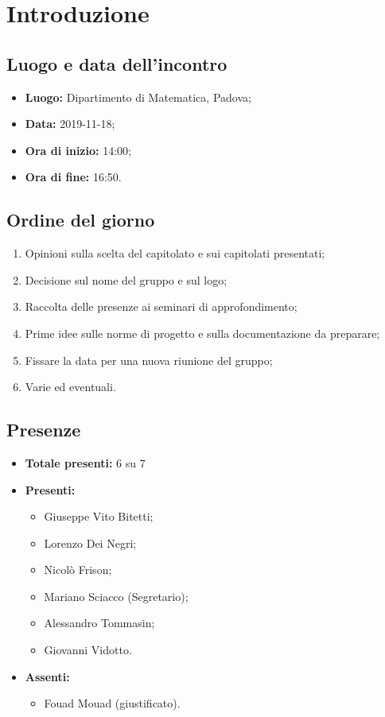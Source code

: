 \section*{Introduzione}

\subsection*{Luogo e data dell'incontro}
	\begin{itemize}
		\item \textbf{Luogo:} Dipartimento di Matematica, Padova;
		\item \textbf{Data:} 2019-11-18;
		\item \textbf{Ora di inizio:} 14:00;
		\item \textbf{Ora di fine:} 16:50.
	\end{itemize}

\subsection*{Ordine del giorno}
	\begin{enumerate}
		\item Opinioni sulla scelta del capitolato e sui capitolati presentati;
		\item Decisione sul nome del gruppo e sul logo;
		\item Raccolta delle presenze ai seminari di approfondimento;
		\item Prime idee sulle norme di progetto e sulla documentazione da preparare;
		\item Fissare la data per una nuova riunione del gruppo;
		\item Varie ed eventuali.
	\end{enumerate}

\subsection*{Presenze}
	\begin{itemize}
		\item \textbf{Totale presenti:} 6 su 7
		\item \textbf{Presenti: }
			\begin{itemize}			
				\item Giuseppe Vito Bitetti;
				\item Lorenzo Dei Negri;
				\item Nicolò Frison;
				\item Mariano Sciacco (Segretario);
				\item Alessandro Tommasin;
				\item Giovanni Vidotto.
			\end{itemize}
		\item \textbf{Assenti: } 
			\begin{itemize}	
				\item Fouad Mouad (giustificato).
			\end{itemize}
	\end{itemize}


